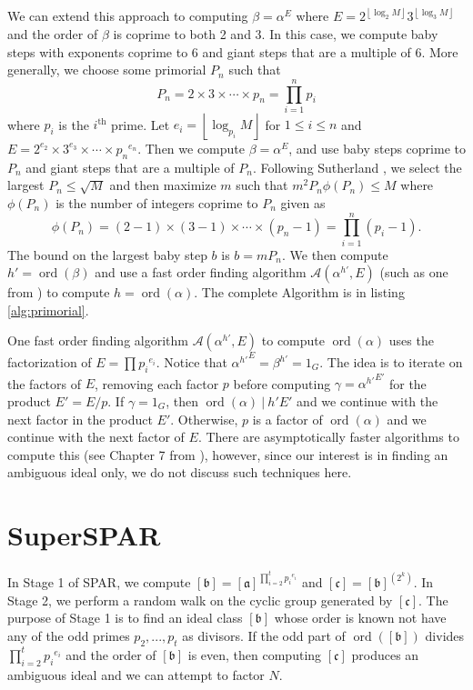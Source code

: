 \documentclass{ucalgthes1}
\theoremstyle{definition}
\DeclareMathOperator{\ord}{ord}
\newcommand{\floor}[1]{\left\lfloor #1 \right\rfloor}
\newcommand{\aclass}{[\mathfrak a]}
\newcommand{\bclass}{[\mathfrak b]}
\newcommand{\cclass}{[\mathfrak c]}
\begin{document}
We can extend this approach to computing $\beta = \alpha^E$ where $E = 2^{\floor{\log_2 M}} 3^{\floor{\log_3 M}}$ and the order of $\beta$ is coprime to both 2 and 3.  In this case, we compute baby steps with exponents coprime to 6 and giant steps that are a multiple of 6.  More generally, we choose some primorial $P_n$ such that
\[
	P_n = 2 \times 3 \times \cdots \times p_n = \prod_{i=1}^n p_i
\]
where $p_i$ is the $i^{\textrm{th}}$ prime. Let $e_i = \floor{\log_{p_i} M}$ for $1 \le i \le n$ and $E = 2^{e_2} \times 3^{e_3} \times \cdots \times {p_n}^{e_n}$.  Then we compute $\beta = \alpha^E$, and use baby steps coprime to $P_n$ and giant steps that are a multiple of $P_n$.  Following Sutherland \cite[p.57]{Sutherland2007}, we select the largest $P_n \le \sqrt{M}$ and then maximize $m$ such that $m^2P_n \phi(P_n) \le M$ where $\phi(P_n)$ is the number of integers coprime to $P_n$ given as
\[
	\phi(P_n) = (2-1) \times (3-1) \times \cdots \times (p_n - 1) = \prod_{i=1}^n (p_i - 1).
\]
The bound on the largest baby step $b$ is $b = m P_n$.  We then compute $h' = \ord(\beta)$ and use a fast order finding algorithm $\mathcal A(\alpha^{h'}, E)$ (such as one from \cite[Chapter 7]{Sutherland2007}) to compute $h = \ord(\alpha)$.  The complete Algorithm is in listing \ref{alg:primorial}.

One fast order finding algorithm $\mathcal A(\alpha^{h'}, E)$ to compute $\ord(\alpha)$ uses the factorization of $E=\prod {p_i}^{e_i}$.  Notice that ${\alpha^{h'}}^E = \beta^{h'} = 1_G$.  The idea is to iterate on the factors of $E$, removing each factor $p$ before computing $\gamma = {\alpha^{h'}}^{E'}$ for the product $E' = E/p$. If $\gamma = 1_G$, then $\ord(\alpha) ~|~ h'E'$ and we continue with the next factor in the product $E'$.  Otherwise, $p$ is a factor of $\ord(\alpha)$ and we continue with the next factor of $E$.  There are asymptotically faster algorithms to compute this (see Chapter 7 from \cite{Sutherland2007}), however, since our interest is in finding an ambiguous ideal only, we do not discuss such techniques here.


\bigbreak
\section{SuperSPAR}
\label{sec:superSpar}


In Stage 1 of SPAR, we compute $\bclass = \aclass^{\prod_{i=2}^t {p_i}^{e_i}}$ and $\cclass = \bclass^{\left(2^k\right)}$.  In Stage 2, we perform a random walk on the cyclic group generated by $\cclass$.  The purpose of Stage 1 is to find an ideal class $\bclass$ whose order is known not have any of the odd primes $p_2, ..., p_t$ as divisors.  If the odd part of $\ord(\bclass)$ divides $\prod_{i=2}^t {p_i}^{e_i}$ and the order of $\bclass$ is even, then computing $\cclass$ produces an ambiguous ideal and we can attempt to factor $N$.
\end{document}
